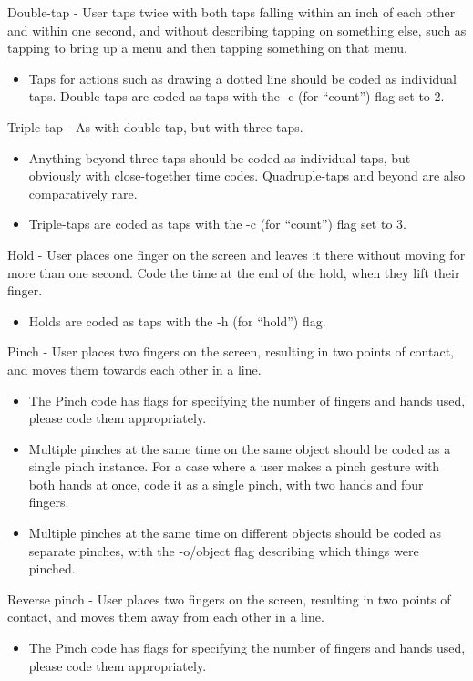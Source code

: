Double-tap - User taps twice with both taps falling within an inch of each other and within one second, and without describing tapping on something else, such as tapping to bring up a menu and then tapping something on that menu. 
\begin{itemize}
	\item Taps for actions such as drawing a dotted line should be coded as individual taps. 
Double-taps are coded as taps with the -c (for ``count'') flag set to 2. 
\end{itemize}

Triple-tap - As with double-tap, but with three taps. 
\begin{itemize}
	\item Anything beyond three taps should be coded as individual taps, but obviously with close-together time codes. Quadruple-taps and beyond are also comparatively rare. 
	\item Triple-taps are coded as taps with the -c (for ``count'') flag set to 3. 
\end{itemize}

Hold - User places one finger on the screen and leaves it there without moving for more than one second. Code the time at the end of the hold, when they lift their finger. 
\begin{itemize}
	\item Holds are coded as taps with the -h (for ``hold'') flag. 
\end{itemize}

Pinch - User places two fingers on the screen, resulting in two points of contact, and moves them towards each other in a line. 
\begin{itemize}
	\item The Pinch code has flags for specifying the number of fingers and hands used, please code them appropriately.
	\item Multiple pinches at the same time on the same object should be coded as a single pinch instance. For a case where a user makes a pinch gesture with both hands at once, code it as a single pinch, with two hands and four fingers. 
	\item Multiple pinches at the same time on different objects should be coded as separate pinches, with the -o/object flag describing which things were pinched. 
\end{itemize}

Reverse pinch - User places two fingers on the screen, resulting in two points of contact, and moves them away from each other in a line. 
\begin{itemize}
	\item The Pinch code has flags for specifying the number of fingers and hands used, please code them appropriately.
\end{itemize}

